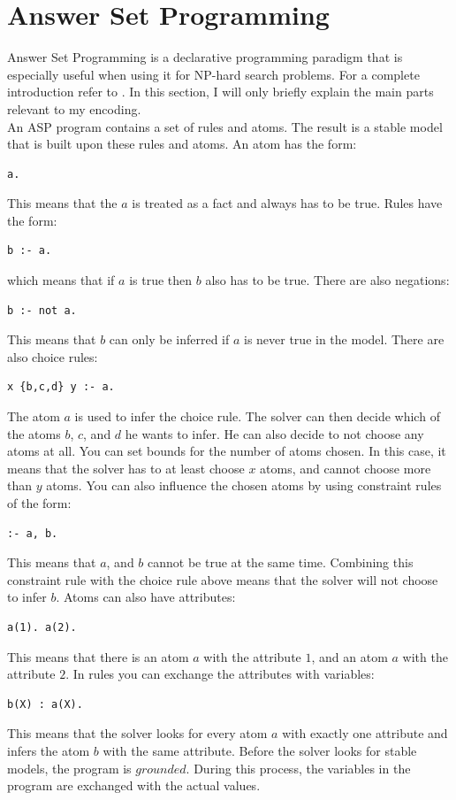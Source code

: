 \documentclass[runningheads]{llncs}
\begin{document}
\section{Answer Set Programming}
Answer Set Programming is a declarative programming paradigm that is especially useful when using it for NP-hard search problems. For a complete introduction refer to \cite{asp}. In this section, I will only briefly explain the main parts relevant to my encoding. \\
An ASP program contains a set of rules and atoms. The result is a stable model that is built upon these rules and atoms. An atom has the form: 
\begin{verbatim}
a.
\end{verbatim}
This means that the $a$ is treated as a fact and always has to be true. Rules have the form:
\begin{verbatim}
b :- a.
\end{verbatim}
which means that if $a$ is true then $b$ also has to be true. There are also negations:
\begin{verbatim}
b :- not a.
\end{verbatim}
This means that $b$ can only be inferred if $a$ is never true in the model. There are also choice rules:
\begin{verbatim}
x {b,c,d} y :- a.
\end{verbatim}
The atom $a$ is used to infer the choice rule. The solver can then decide which of the atoms $b$, $c$, and $d$ he wants to infer. He can also decide to not choose any atoms at all. You can set bounds for the number of atoms chosen. In this case, it means that the solver has to at least choose $x$ atoms, and cannot choose more than $y$ atoms. You can also influence the chosen atoms by using constraint rules of the form:
\begin{verbatim}
:- a, b.
\end{verbatim}
This means that $a$, and $b$ cannot be true at the same time. Combining this constraint rule with the choice rule above means that the solver will not choose to infer $b$. Atoms can also have attributes:
\begin{verbatim}
a(1). a(2).
\end{verbatim}
This means that there is an atom $a$ with the attribute $1$, and an atom $a$ with the attribute $2$. In rules you can exchange the attributes with variables:
\begin{verbatim}
b(X) : a(X).
\end{verbatim}
This means that the solver looks for every atom $a$ with exactly one attribute and infers the atom $b$ with the same attribute. Before the solver looks for stable models, the program is $grounded$. During this process, the variables in the program are exchanged with the actual values. \\
\end{document}

